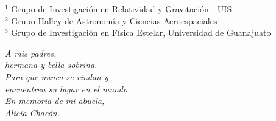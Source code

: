 \documentclass[12pt,oneside,openany,letter]{book}
\renewcommand{\tablename}{Tabla}
\begin{document}
\renewcommand{\listtablename}{Índice de tablas}
\renewcommand{\tablename}{Tabla}
\begin{titlepage}
{}

\vfill


\vfill




\vfill



\vfill
{\Large $^1$ Grupo de Investigaci\'on en Relatividad y Gravitaci\'on - UIS} \\
{\Large $^2$ Grupo Halley de Astronom\'ia y Ciencias Aeroespaciales} \\
{\Large $^3$ Grupo de Investigación en Física Estelar, Universidad de Guanajuato}

\vfill

\end{titlepage}
\newpage

\newpage
\begin{flushright}
\vspace{5 cm}
\textit{A mis padres, \\
hermana y bella sobrina.\\
Para que nunca se rindan y\\
encuentren su lugar en el mundo.\\
En memoria de mi abuela,\\
Alicia Chacón.\\}

\vspace{0.5cm}

\end{flushright}
\end{document}
